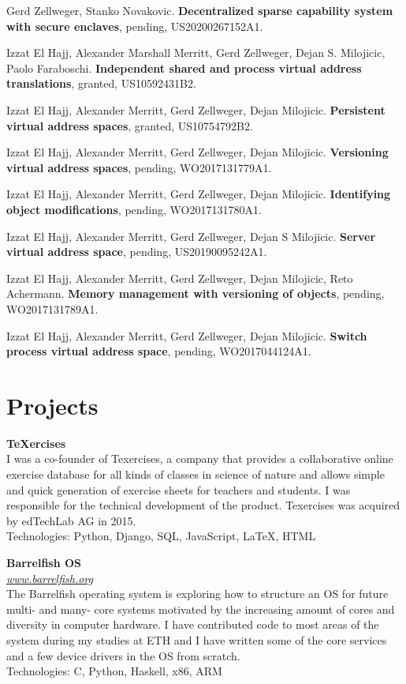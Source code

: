 \documentclass[margin,line]{cv/cv}
\begin{document}
\begin{resume}
    Gerd Zellweger, Stanko Novakovic.
    \textbf{Decentralized sparse capability system with secure enclaves},
    pending, US20200267152A1.

    Izzat El Hajj, Alexander Marshall Merritt, Gerd Zellweger, Dejan S. Milojicic, Paolo Faraboschi.
    \textbf{Independent shared and process virtual address translations},
    granted, US10592431B2.

    Izzat El Hajj, Alexander Merritt, Gerd Zellweger, Dejan Milojicic.
    \textbf{Persistent virtual address spaces},
    granted, US10754792B2.

    Izzat El Hajj, Alexander Merritt, Gerd Zellweger, Dejan Milojicic.
    \textbf{Versioning virtual address spaces},
    pending, WO2017131779A1.

    Izzat El Hajj, Alexander Merritt, Gerd Zellweger, Dejan Milojicic.
    \textbf{Identifying object modifications},
    pending, WO2017131780A1.

    Izzat El Hajj, Alexander Merritt, Gerd Zellweger, Dejan S Milojicic.
    \textbf{Server virtual address space},
    pending, US20190095242A1.

    Izzat El Hajj, Alexander Merritt, Gerd Zellweger, Dejan Milojicic, Reto Achermann.
    \textbf{Memory management with versioning of objects},
    pending, WO2017131789A1.

    Izzat El Hajj, Alexander Merritt, Gerd Zellweger, Dejan Milojicic.
    \textbf{Switch process virtual address space},
    pending, WO2017044124A1.


    \section{\mysidestyle Projects}
    \textbf{{\TeX}ercises} \\\vspace{1mm}%
    I was a co-founder of Texercises, a company that provides a collaborative online
    exercise database for all kinds of classes in science of nature and allows
    simple and quick generation of exercise sheets for teachers and students. I was
    responsible for the technical development of the product. Texercises was
    acquired by edTechLab AG in 2015.\\
    Technologies: Python, Django, SQL, JavaScript, LaTeX, HTML

    \textbf{Barrelfish OS} \\\vspace{1mm}%
    \textsl{\url{www.barrelfish.org}} \hfill \\
    The Barrelfish operating system is exploring how to structure an OS for future
    multi- and many- core systems motivated by the increasing amount of cores and
    diversity in computer hardware. I have contributed code to most areas of the
    system during my studies at ETH and I have written some of the core services
    and a few device drivers in the OS from scratch.\\ Technologies: C, Python,
    Haskell, x86, ARM


\end{resume}
\end{document}
